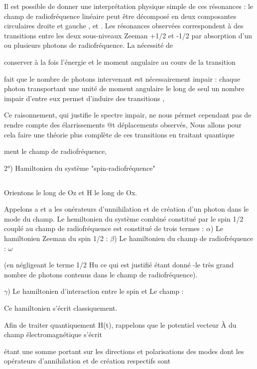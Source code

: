 Il est possible de donner une interprétation physique simple de ces
résonances : le champ de radiofréquence linéaire peut être décomposé en deux
composantes circulaires droite et gauche , et . Les résonances observées correspondent
à des transitions entre les deux sous-niveaux Zeeman +1/2 et -1/2
par absorption d'un ou plusieurs photons de radiofréquence. La nécessité de

conserver à la fois l'énergie et le moment angulaire au cours de la transition

fait que le nombre de photons intervenant est nécessairement impair : chaque
photon transportant une unité de moment angulaire le long de seul un
nombre impair d'entre eux permet d'induire des transitions ,

Ce raisonnement, qui justifie le spectre impair, ne nous pérmet cependant pas
de rendre compte des élarrissements @t déplacements observés, Nous allons pour
cela faire une théorie plus complète de ces transitions en traitant quantique

ment le champ de radiofréquence,

2°) Hamiltonien du système "spin-radiofréquence"

\subsection{}%

Orientons  le long de Oz et H le long de Ox.

Appelons a et a les onérateurs d'unnihilation et de création d'un
photon dans le mode du champ. Le hemiltonien du système combiné constitué par
le spin 1/2 couplé au champ de radiofréquence est constitué de trois termes :
$\alpha$) Le hamiltonien Zeeman du spin 1/2 :
$\beta$) Le hamiltonien du champ de radiofréquence : $\omega$

(en négligeant le terme 1/2 Hu ce qui est justifié étant donné -le très grand
nombre de photons contenus dans le champ de radiofréquence).

$\gamma$) Le hamiltonien d'interaction entre le spin et Le champ : 

Ce hamiltonien s'écrit classiquement.


Afin de traiter quantiquement H(t), rappelons que le potentiel
vecteur À du champ électromagnétique s'écrit

étant une somme portant sur les directions et polarisations des modes
dont les opérateurs d'annihilation et de création respectifs sont

